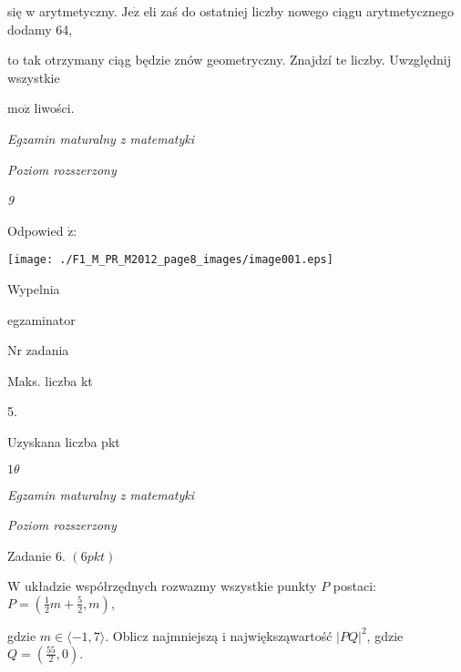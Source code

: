 \documentclass[a4paper,12pt]{article}
\begin{document}
się w arytmetyczny. $\mathrm{J}\mathrm{e}\dot{\mathrm{z}}$ eli zaś do ostatniej liczby nowego ciągu arytmetycznego dodamy 64,

to tak otrzymany ciąg będzie znów geometryczny. Znajdzí te liczby. Uwzględnij wszystkie

$\mathrm{m}\mathrm{o}\dot{\mathrm{z}}$ liwości.





{\it Egzamin maturalny z matematyki}

{\it Poziom rozszerzony}

{\it 9}

Odpowied $\acute{\mathrm{z}}$:
\begin{center}
\texttt{[image: ./F1\_M\_PR\_M2012\_page8\_images/image001.eps]}
\end{center}
Wypelnia

egzaminator

Nr zadania

Maks. liczba kt

5.

Uzyskana liczba pkt





$ 1\theta$

{\it Egzamin maturalny z matematyki}

{\it Poziom rozszerzony}

Zadanie 6. $(6pkt)$

$\mathrm{W}$ układzie współrzędnych rozwazmy wszystkie punkty $P$ postaci: $P=(\displaystyle \frac{1}{2}m+\frac{5}{2},m),$

gdzie $ m\in\langle-1,7\rangle$. Oblicz najmniejszą i największąwartość $|PQ|^{2}$, gdzie $Q=(\displaystyle \frac{55}{2},0).$
\end{document}
